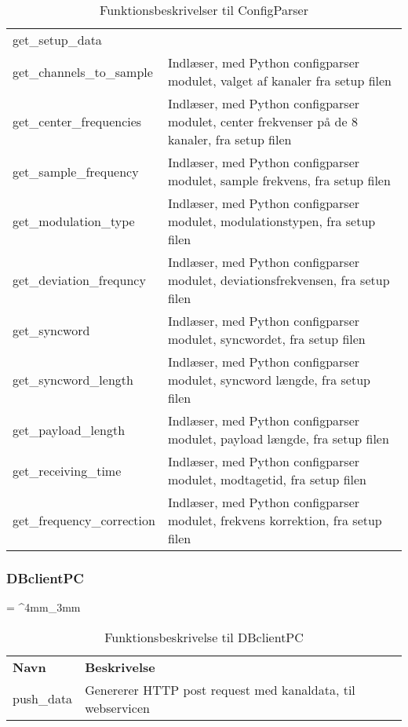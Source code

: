 \begin{appendices}
\begin{table}[H]
\begin{tabu}{ m{4cm}  m{8.5cm} }
		get\_setup\_data 			&  \\
		get\_channels\_to\_sample 	& Indlæser, med Python configparser modulet, valget af kanaler fra setup filen \\
		get\_center\_frequencies 	& Indlæser, med Python configparser modulet, center frekvenser på de 8 kanaler, fra setup filen\\
		get\_sample\_frequency 		& Indlæser, med Python configparser modulet, sample frekvens, fra setup filen\\
		get\_modulation\_type 		& Indlæser, med Python configparser modulet, modulationstypen, fra setup filen \\
		get\_deviation\_frequncy 	& Indlæser, med Python configparser modulet, deviationsfrekvensen, fra setup filen \\
		get\_syncword 				& Indlæser, med Python configparser modulet, syncwordet, fra setup filen \\
		get\_syncword\_length 		& Indlæser, med Python configparser modulet, syncword længde, fra setup filen \\
		get\_payload\_length 		& Indlæser, med Python configparser modulet, payload længde, fra setup filen \\
		get\_receiving\_time 		& Indlæser, med Python configparser modulet, modtagetid, fra setup filen \\
		get\_frequency\_correction 	& Indlæser, med Python configparser modulet, frekvens korrektion, fra setup filen \\
		
	\end{tabu}
	\caption{Funktionsbeskrivelser til ConfigParser}
	\label{tab:func_descr_configparser}
\end{table}
\pagebreak 

\subsubsection{DBclientPC}
\begin{table}[H]
	\renewcommand{\arraystretch}{2}
	\centering
	\sffamily
	\tabulinesep = ^4mm_3mm
	\begin{tabu}{ m{4cm}  m{8.5cm} }
		\color{white}\bfseries Navn &\color{white}\bfseries Beskrivelse \\
		push\_data & Genererer HTTP post request med kanaldata, til webservicen \\
	\end{tabu}
	\caption{Funktionsbeskrivelse til DBclientPC}
	\label{tab:func_descr_DbclientPC}
\end{table}


\end{appendices}
